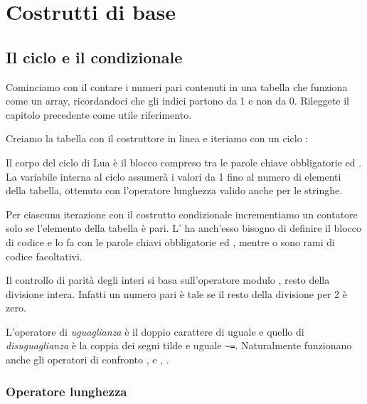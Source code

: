 

\chapter{Costrutti di base}

\section{Il ciclo  e il condizionale }
\label{secFondCicloIf}

Cominciamo con il contare i numeri pari contenuti in una tabella che funziona
come un array, ricordandoci che gli indici partono da 1 e non da 0. Rileggete
il capitolo precedente come utile riferimento.

Creiamo la tabella con il costruttore in linea e iteriamo con un ciclo
:

Il corpo del ciclo  di Lua è il blocco compreso tra le parole
chiave obbligatorie  ed . La variabile  interna
al ciclo assumerà i valori da 1 fino al numero di elementi della tabella,
ottenuto con l'operatore lunghezza \key{\#} valido anche per le stringhe.

Per ciascuna iterazione con il costrutto condizionale 
incrementiamo un contatore solo se l'elemento della tabella è pari. L'
ha anch'esso bisogno di definire il blocco di codice e lo fa con le parole
chiavi obbligatorie  ed , mentre
 o  sono rami di codice
facoltativi.

Il controllo di parità degli interi si basa sull'operatore modulo
\key{\%}\luas{\%}, resto della divisione intera. Infatti un numero pari è tale
se il resto della divisione per 2 è zero. 

L'operatore di \emph{uguaglianza} è il doppio carattere di uguale
\key{==}\luas{==} e quello di \emph{disuguaglianza} è la coppia dei segni tilde
e uguale \verb|~=|\luas{~=}. Naturalmente funzionano anche gli operatori di
confronto \key{>}\luas{>}, \key{>=}\luas{>=} e \key{<}\luas{<},
\key{<=}\luas{<=}.


\subsection{Operatore lunghezza}
\label{secFondLenOperator}

